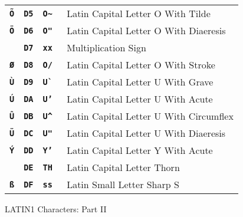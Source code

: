 \documentclass[12pt]{article}
\newcommand{\TT}[1]{{\tt \bfseries #1}}
\newlength{\figurewidth}
\newenvironment{boxedfigure}[1][!btp]%
	{\begin{figure*}[#1]
	 \begin{lrbox}{\figurebox}
	 \begin{minipage}{\figurewidth}

	 \vspace*{1ex}}%
	{
	 \vspace*{1ex}

	 \end{minipage}
	 \end{lrbox}

	 \centering
	 \fbox{\hspace*{0.1in}\usebox{\figurebox}\hspace*{0.1in}}
	 \end{figure*}}
\begin{document}
\begin{boxedfigure}[p]
\begin{tabular}{llll}
\TT{\~O}
  & \TT{D5} & \TT{O\textasciitilde} & Latin Capital Letter O With Tilde \\
\TT{\"O}
  & \TT{D6} & \TT{O"} & Latin Capital Letter O With Diaeresis \\
\TT{\texttimes}
  & \TT{D7} & \TT{xx} & Multiplication Sign \\
\TT{\O}
  & \TT{D8} & \TT{O/} & Latin Capital Letter O With Stroke \\
\TT{\`U}
  & \TT{D9} & \TT{U\`~} & Latin Capital Letter U With Grave \\
\TT{\'U}
  & \TT{DA} & \TT{U'} & Latin Capital Letter U With Acute \\
\TT{\^U}
  & \TT{DB} & \TT{U\textasciicircum} & Latin Capital Letter U With Circumflex \\
\TT{\"U}
  & \TT{DC} & \TT{U"} & Latin Capital Letter U With Diaeresis \\
\TT{\'Y}
  & \TT{DD} & \TT{Y'} & Latin Capital Letter Y With Acute \\
\TT{\TH}
  & \TT{DE} & \TT{TH} & Latin Capital Letter Thorn \\
\TT{\ss}
  & \TT{DF} & \TT{ss} & Latin Small Letter Sharp S \\
\end{tabular}
\caption{LATIN1 Characters: Part II}
\label{LATIN1-CHARACTERS-II}
\end{boxedfigure}
\end{document}
